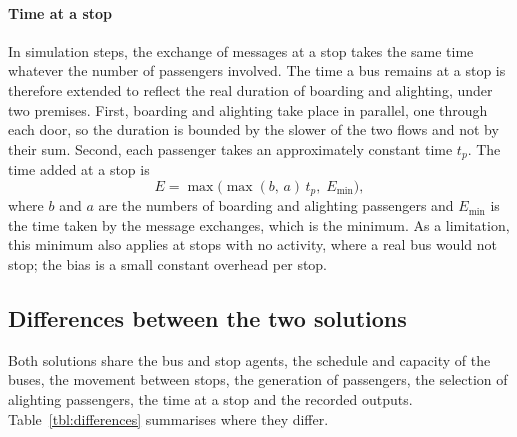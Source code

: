 \documentclass[a4paper,fleqn]{cas-sc}
\begin{document}
\paragraph{Time at a stop}
In simulation steps, the exchange of messages at a stop takes the same time
whatever the number of passengers involved. The time a bus remains at a stop
is therefore extended to reflect the real duration of boarding and alighting,
under two premises. First, boarding and alighting take place in parallel, one
through each door, so the duration is bounded by the slower of the two flows
and not by their sum. Second, each passenger takes an approximately constant
time $t_p$. The time added at a stop is
\begin{equation}\label{eq:dwell}
E = \max\bigl( \max(b,\, a)\, t_p,\; E_{\min} \bigr),
\end{equation}
where $b$ and $a$ are the numbers of boarding and alighting passengers and
$E_{\min}$ is the time taken by the message exchanges, which is the minimum.
As a limitation, this minimum also applies at stops with no activity, where a
real bus would not stop; the bias is a small constant overhead per stop.
 
\subsection{Differences between the two solutions}\label{sec:differences}
 
Both solutions share the bus and stop agents, the schedule and capacity of the
buses, the movement between stops, the generation of passengers, the selection
of alighting passengers, the time at a stop and the recorded outputs.
Table~\ref{tbl:differences} summarises where they differ.
 
\end{document}

